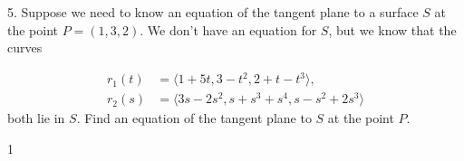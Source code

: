 \documentclass[12pt]{article}
\begin{document}
5. Suppose we need to know an equation of the tangent plane to a surface $S$ at
the point $P = (1, 3, 2)$. We don’t have an equation for $S$, but we know that the
curves

\begin{align*}
r_1(t) &= \langle 1 + 5t,    3 - t^2,       2 + t - t^3    \rangle, \\
r_2(s) &= \langle 3s - 2s^2, s + s^3 + s^4, s - s^2 + 2s^3 \rangle
\end{align*}
both lie in $S$. Find an equation of the tangent plane to $S$ at the point $P$.


\begin{mdframed}
1
\end{mdframed}
\end{document}
